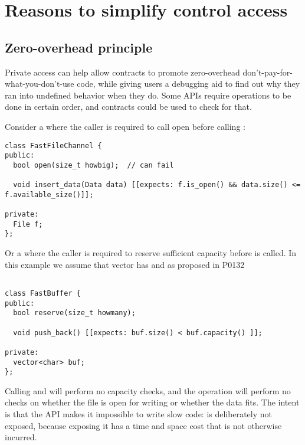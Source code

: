 \section{Reasons to simplify control access}

\subsection{Zero-overhead principle}

Private access can help allow contracts to promote zero-overhead
don’t-pay-for-what-you-don’t-use code, while giving users a debugging aid to
find out why they ran into undefined behavior when they do.  Some APIs require
operations to be done in certain order, and contracts could be used to check
for that.  

Consider a  where the caller is required to call open
before calling :

\begin{lstlisting}
class FastFileChannel {
public:
  bool open(size_t howbig);  // can fail

  void insert_data(Data data) [[expects: f.is_open() && data.size() <= f.available_size()]];

private:
  File f;
};
\end{lstlisting}

Or a  where the caller is required to reserve sufficient
capacity before  is called. In this example we assume that
vector has  and  as
proposed in P0132~\cite{p0132}

\begin{lstlisting}

class FastBuffer {
public:
  bool reserve(size_t howmany);

  void push_back() [[expects: buf.size() < buf.capacity() ]];

private:
  vector<char> buf;
};
\end{lstlisting}

Calling  and
 will perform no capacity checks, and the
 operation will perform no checks on whether the file is
open for writing or whether the data fits. The intent is that the API makes it
impossible to write slow code:  is deliberately not
exposed, because exposing it has a time and space cost that is not otherwise
incurred.

